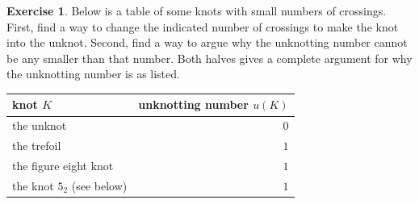 \documentclass[12pt,letterpaper]{article}
\theoremstyle{definition}
\newtheorem{exercise}[question]{Exercise}
\begin{document}
\begin{exercise}
Below is a table of some knots with small numbers of crossings.
First, find a way to change the indicated number of crossings to make the knot into the unknot.
Second, find a way to argue why the unknotting number cannot be any smaller than that number.
Both halves gives a complete argument for why the unknotting number is as listed.
\end{exercise}
\begin{center}
\begin{tabular}{lr}
knot $K$ & unknotting number $u(K)$ \\
\hline
the unknot & $0$ \\
the trefoil & $1$ \\
the figure eight knot & $1$ \\
the knot $5_2$ (see below) & $1$
\end{tabular}
\end{center}
\end{document}
